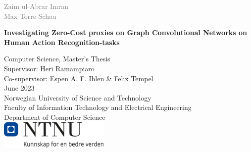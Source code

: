 \begin{titlepage}
        \vspace*{0.3cm}
        \noindent
        \textcolor{gray}{\Large Zaim ul-Abrar Imran}\\[0.2cm]
        \textcolor{gray}{\Large Max Torre Schau}\\
        
        \vspace{0.6cm}
        
        { \noindent \huge \bfseries Investigating Zero-Cost proxies on Graph Convolutional Networks on Human Action Recognition-tasks}

        \vspace{6.0cm}
        \noindent
        Computer Science, Master's Thesis \\
        Supervisor: Heri Ramampiaro\\
        Co-supervisor: Espen A. F. Ihlen \& Felix Tempel\\     
        June 2023\\

        \vspace{0.8cm} 
        \noindent
        Norwegian University of Science and Technology\\
        Faculty of Information Technology and Electrical Engineering\\
        Department of Computer Science\\
       
        \vspace{0.8cm}
        \noindent
        \includegraphics[width=0.40\textwidth]{figures/NTNU_logo.png}\\
\end{titlepage}



